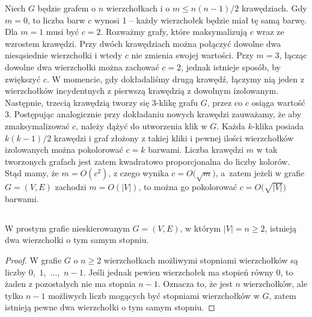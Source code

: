 Niech $G$ będzie grafem o $n$ wierzchołkach i o $m\le n(n-1)/2$ krawędziach. Gdy $m=0$, to liczba barw $c$ wynosi 1 -- każdy wierzchołek będzie miał tę samą barwę. Dla $m=1$ musi być $c=2$. Rozważmy grafy, które maksymalizują $c$ wraz ze wzrostem krawędzi. Przy dwóch krawędziach można połączyć dowolne dwa niesąsiednie wierzchołki i wtedy $c$ nie zmienia swojej wartości. Przy $m=3$, łącząc dowolne dwa wierzchołki można zachować $c=2$, jednak istnieje sposób, by zwiększyć $c$. W momencie, gdy dokładaliśmy drugą krawędź, łączymy nią jeden z wierzchołków incydentnych z pierwszą krawędzią z dowolnym izolowanym. Następnie, trzecią krawędzią tworzy się \hbox{3-klikę} grafu $G$, przez co $c$ osiąga wartość 3. Postępując analogicznie przy dokładaniu nowych krawędzi zauważamy, że aby zmaksymalizować $c$, należy dążyć do utworzenia klik w $G$. Każda $k$-klika posiada $k(k-1)/2$ krawędzi i graf złożony z takiej kliki i pewnej ilości wierzchołków izolowanych można pokolorować $c=k$ barwami. Liczba krawędzi $m$ w tak tworzonych grafach jest zatem kwadratowo proporcjonalna do liczby kolorów. Stąd mamy, że $m=O(c^2)$, z czego wynika $c=O\bigl(\!\sqrt{m}\bigr)$, a~zatem jeżeli w grafie $G=(V,E)$ zachodzi $m=O(|V|)$, to można go pokolorować $c=O\bigl(\!\sqrt{|V|}\bigr)$ barwami.

\subsection{} %
\subsubsection{} %
\begin{twierdzenie*}
	W prostym grafie nieskierowanym $G=(V,E)$, w którym $|V|=n\ge2$, istnieją dwa wierzchołki o tym samym stopniu.
\end{twierdzenie*}
\begin{proof}
W grafie $G$ o $n\ge2$ wierzchołkach możliwymi stopniami wierzchołków są liczby $0$,~$1$,~$\dots$,~$n-1$. Jeśli jednak pewien wierzchołek ma stopień równy 0, to żaden z pozostałych nie ma stopnia $n-1$. Oznacza to, że jest $n$ wierzchołków, ale tylko $n-1$ możliwych liczb mogących być stopniami wierzchołków w $G$, zatem istnieją pewne dwa wierzchołki o tym samym stopniu.
\end{proof}

